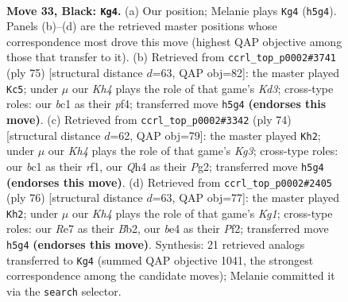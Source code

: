 \documentclass[11pt]{article}
\begin{document}
\clearpage

\begin{figure}[p]\centering
\begin{subfigure}{0.46\textwidth}\centering
\resizebox{\linewidth}{!}{%
\newchessgame
\chessboard[
  setfen={8/p3r3/p3p2Q/7k/4B2q/1N6/1P3R2/2B3K1 b - - 3 33},
  showmover=false,
  pgfstyle=straightmove, color=movearrow, markmove={h5-g4}
]}
\caption{}
\end{subfigure}\hfill
\begin{subfigure}{0.46\textwidth}\centering
\resizebox{\linewidth}{!}{%
\newchessgame
\chessboard[
  setfen={3r4/2q2B2/p2kQ3/6Pp/5P2/8/7P/1K6 b - - 0 38},
  showmover=false,
  pgfstyle=straightmove, color=movearrow, markmove={d6-c5}
]}
\caption{}
\end{subfigure}
\\[4pt]
\begin{subfigure}{0.46\textwidth}\centering
\resizebox{\linewidth}{!}{%
\newchessgame
\chessboard[
  setfen={8/2Q1R3/5pk1/3p4/8/6KP/PP3qP1/5r2 w - - 2 38},
  showmover=false,
  pgfstyle=straightmove, color=movearrow, markmove={g3-h2}
]}
\caption{}
\end{subfigure}\hfill
\begin{subfigure}{0.46\textwidth}\centering
\resizebox{\linewidth}{!}{%
\newchessgame
\chessboard[
  setfen={5k2/5p2/3p4/3P4/6QP/P2b4/1B3P2/5qK1 w - - 0 39},
  showmover=false,
  pgfstyle=straightmove, color=movearrow, markmove={g1-h2}
]}
\caption{}
\end{subfigure}
\caption{\textbf{Move 33, Black: \texttt{Kg4}.} (a) Our position; Melanie plays \texttt{Kg4} (\texttt{h5g4}). Panels (b)--(d) are the retrieved master positions whose correspondence most drove this move (highest QAP objective among those that transfer to it). (b) Retrieved from \texttt{ccrl\_top\_p0002\#3741} (ply 75) [structural distance $d$=63, QAP obj=82]: the master played \texttt{Kc5}; under $\mu$ our \emph{Kh4} plays the role of that game's \emph{Kd3}; cross-type roles: our \emph{b}c1 as their \emph{p}f4; transferred move \texttt{h5g4} \textbf{(endorses this move)}. (c) Retrieved from \texttt{ccrl\_top\_p0002\#3342} (ply 74) [structural distance $d$=62, QAP obj=79]: the master played \texttt{Kh2}; under $\mu$ our \emph{Kh4} plays the role of that game's \emph{Kg3}; cross-type roles: our \emph{b}c1 as their \emph{r}f1, our \emph{Q}h4 as their \emph{P}g2; transferred move \texttt{h5g4} \textbf{(endorses this move)}. (d) Retrieved from \texttt{ccrl\_top\_p0002\#2405} (ply 76) [structural distance $d$=63, QAP obj=77]: the master played \texttt{Kh2}; under $\mu$ our \emph{Kh4} plays the role of that game's \emph{Kg1}; cross-type roles: our \emph{R}e7 as their \emph{B}b2, our \emph{b}e4 as their \emph{P}f2; transferred move \texttt{h5g4} \textbf{(endorses this move)}. Synthesis: 21 retrieved analogs transferred to \texttt{Kg4} (summed QAP objective 1041, the strongest correspondence among the candidate moves); Melanie committed it via the \texttt{search} selector.}
\label{fig:thought-m65}
\end{figure}
\end{document}
